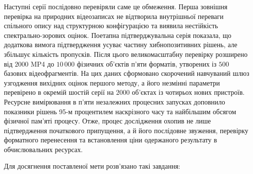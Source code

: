 Наступні серії послідовно перевіряли саме це обмеження. Перша зовнішня перевірка на природних відеозаписах не відтворила внутрішньої переваги спільного опису над структурною конфігурацією та виявила нестійкість спектрально-зорових оцінок. Поетапна підтверджувальна серія показала, що додаткова вимога підтвердження усуває частину хибнопозитивних рішень, але збільшує кількість пропусків. Після цього великомасштабну перевірку розширено від $2000$ MP4 до $10\,000$ фізичних об’єктів п’яти форматів, утворених із $500$ базових відеофрагментів. На цих даних сформовано скорочений навчуваний шлюз узгодження вихідних оцінок першого методу, а його незмінні параметри перевірено в окремій шостій серії на $2000$ об’єктах із чотирьох нових пристроїв. Ресурсне вимірювання в п’яти незалежних процесних запусках доповнило показники рішень 95-м процентилем наскрізного часу та найбільшим обсягом фізичної пам’яті процесу. Отже, процес дослідження охопив не лише підтвердження початкового припущення, а й його послідовне звуження, перевірку форматного перенесення та встановлення ціни одержаного результату в обчислювальних ресурсах.

Для досягнення поставленої мети розв’язано такі завдання:

